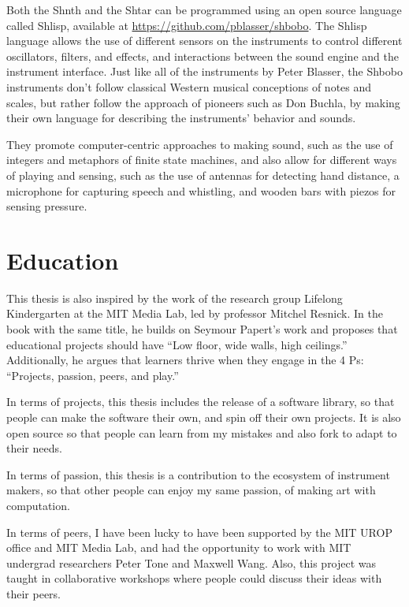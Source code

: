 Both the Shnth and the Shtar can be programmed using an open source language called Shlisp, available at \url{https://github.com/pblasser/shbobo}. The Shlisp language allows the use of different sensors on the instruments to control different oscillators, filters, and effects, and interactions between the sound engine and the instrument interface. Just like all of the instruments by Peter Blasser, the Shbobo instruments don't follow classical Western musical conceptions of notes and scales, but rather follow the approach of pioneers such as Don Buchla, by making their own language for describing the instruments' behavior and sounds.

They promote computer-centric approaches to making sound, such as the use of integers and metaphors of finite state machines, and also allow for different ways of playing and sensing, such as the use of antennas for detecting hand distance, a microphone for capturing speech and whistling, and wooden bars with piezos for sensing pressure.

\section{Education}

This thesis is also inspired by the work of the research group Lifelong Kindergarten at the MIT Media Lab, led by professor Mitchel Resnick. In the book with the same title, he builds on Seymour Papert’s work and proposes that educational projects should have “Low floor, wide walls, high ceilings.” Additionally, he argues that learners thrive when they engage in the 4 Ps: “Projects, passion, peers, and play.”

In terms of projects, this thesis includes the release of a software library, so that people can make the software their own, and spin off their own projects. It is also open source so that people can learn from my mistakes and also \gls{fork} to adapt to their needs.

In terms of passion, this thesis is a contribution to the ecosystem of instrument makers, so that other people can enjoy my same passion, of making art with computation.

In terms of peers, I have been lucky to have been supported by the MIT UROP office and MIT Media Lab, and had the opportunity to work with MIT undergrad researchers Peter Tone and Maxwell Wang. Also, this project was taught in collaborative workshops where people could discuss their ideas with their peers.

